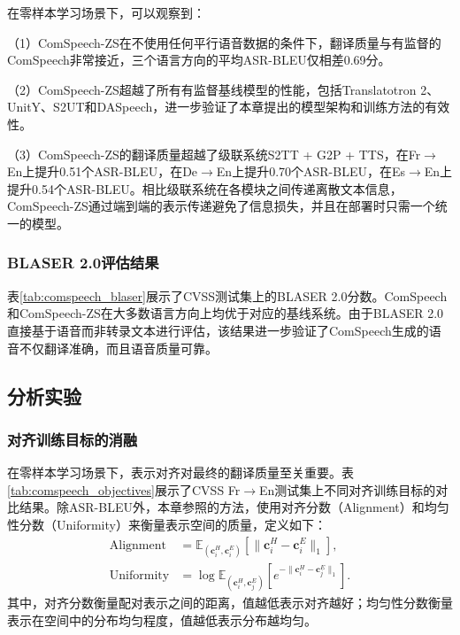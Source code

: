 

在零样本学习场景下，可以观察到：

（1）ComSpeech-ZS在不使用任何平行语音数据的条件下，翻译质量与有监督的ComSpeech非常接近，三个语言方向的平均ASR-BLEU仅相差0.69分。

（2）ComSpeech-ZS超越了所有有监督基线模型的性能，包括Translatotron 2、UnitY、S2UT和DASpeech，进一步验证了本章提出的模型架构和训练方法的有效性。

（3）ComSpeech-ZS的翻译质量超越了级联系统S2TT + G2P + TTS，在Fr$\rightarrow$En上提升0.51个ASR-BLEU，在De$\rightarrow$En上提升0.70个ASR-BLEU，在Es$\rightarrow$En上提升0.54个ASR-BLEU。相比级联系统在各模块之间传递离散文本信息，ComSpeech-ZS通过端到端的表示传递避免了信息损失，并且在部署时只需一个统一的模型。

\subsubsection{BLASER 2.0评估结果}

表\ref{tab:comspeech_blaser}展示了CVSS测试集上的BLASER 2.0分数。ComSpeech和ComSpeech-ZS在大多数语言方向上均优于对应的基线系统。由于BLASER 2.0直接基于语音而非转录文本进行评估，该结果进一步验证了ComSpeech生成的语音不仅翻译准确，而且语音质量可靠。


\subsection{分析实验}

\subsubsection{对齐训练目标的消融}



在零样本学习场景下，表示对齐对最终的翻译质量至关重要。表\ref{tab:comspeech_objectives}展示了CVSS Fr$\rightarrow$En测试集上不同对齐训练目标的对比结果。除ASR-BLEU外，本章参照\citet{pmlr-v119-wang20k}的方法，使用对齐分数（Alignment）和均匀性分数（Uniformity）来衡量表示空间的质量，定义如下：
\begin{align}
    \text{Alignment} &= \mathbb{E}_{(\mathbf{c}^H_i, \mathbf{c}^E_i)} \left[\|\mathbf{c}^H_i - \mathbf{c}^E_i\|_1\right], \\
    \text{Uniformity} &= \log \mathbb{E}_{(\mathbf{c}^H_i, \mathbf{c}^E_j)} \left[e^{-\|\mathbf{c}^H_i - \mathbf{c}^E_j\|_1}\right].
\end{align}
其中，对齐分数衡量配对表示之间的距离，值越低表示对齐越好；均匀性分数衡量表示在空间中的分布均匀程度，值越低表示分布越均匀。

